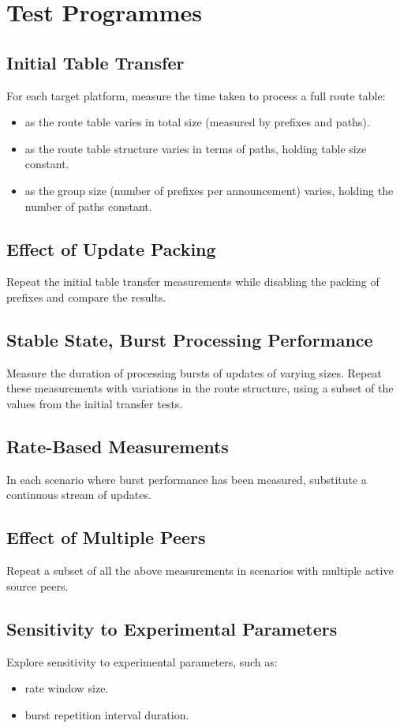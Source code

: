 \section{Test Programmes}

\subsection{Initial Table Transfer}
For each target platform, measure the time taken to process a full route table:
\begin{itemize}
    \item as the route table varies in total size (measured by prefixes and paths).
    \item as the route table structure varies in terms of paths, holding table size constant.
    \item as the group size (number of prefixes per announcement) varies, holding the number of paths constant.
\end{itemize}

\subsection{Effect of Update Packing}
Repeat the initial table transfer measurements while disabling the packing of prefixes and compare the results.

\subsection{Stable State, Burst Processing Performance}
Measure the duration of processing bursts of updates of varying sizes. Repeat these measurements with variations in the route structure, using a subset of the values from the initial transfer tests.

\subsection{Rate-Based Measurements}
In each scenario where burst performance has been measured, substitute a continuous stream of updates.

\subsection{Effect of Multiple Peers}
Repeat a subset of all the above measurements in scenarios with multiple active source peers.

\subsection{Sensitivity to Experimental Parameters}
Explore sensitivity to experimental parameters, such as:
\begin{itemize}
    \item rate window size.
    \item burst repetition interval duration.
\end{itemize}

